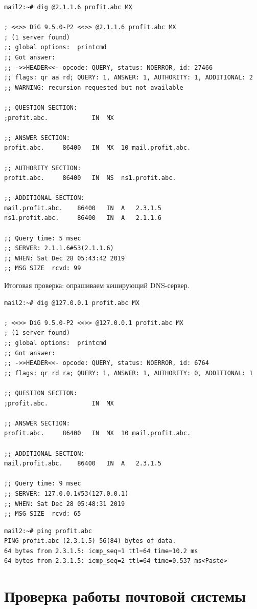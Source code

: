 \documentclass[a4paper,12pt]{article}
\begin{document}
\begin{verbatim}
mail2:~# dig @2.1.1.6 profit.abc MX

; <<>> DiG 9.5.0-P2 <<>> @2.1.1.6 profit.abc MX
; (1 server found)
;; global options:  printcmd
;; Got answer:
;; ->>HEADER<<- opcode: QUERY, status: NOERROR, id: 27466
;; flags: qr aa rd; QUERY: 1, ANSWER: 1, AUTHORITY: 1, ADDITIONAL: 2
;; WARNING: recursion requested but not available

;; QUESTION SECTION:
;profit.abc.			IN	MX

;; ANSWER SECTION:
profit.abc.		86400	IN	MX	10 mail.profit.abc.

;; AUTHORITY SECTION:
profit.abc.		86400	IN	NS	ns1.profit.abc.

;; ADDITIONAL SECTION:
mail.profit.abc.	86400	IN	A	2.3.1.5
ns1.profit.abc.		86400	IN	A	2.1.1.6

;; Query time: 5 msec
;; SERVER: 2.1.1.6#53(2.1.1.6)
;; WHEN: Sat Dec 28 05:43:42 2019
;; MSG SIZE  rcvd: 99
\end{verbatim}

Итоговая проверка: опрашиваем кеширующий DNS-сервер.

\begin{verbatim}
mail2:~# dig @127.0.0.1 profit.abc MX

; <<>> DiG 9.5.0-P2 <<>> @127.0.0.1 profit.abc MX
; (1 server found)
;; global options:  printcmd
;; Got answer:
;; ->>HEADER<<- opcode: QUERY, status: NOERROR, id: 6764
;; flags: qr rd ra; QUERY: 1, ANSWER: 1, AUTHORITY: 0, ADDITIONAL: 1

;; QUESTION SECTION:
;profit.abc.			IN	MX

;; ANSWER SECTION:
profit.abc.		86400	IN	MX	10 mail.profit.abc.

;; ADDITIONAL SECTION:
mail.profit.abc.	86400	IN	A	2.3.1.5

;; Query time: 9 msec
;; SERVER: 127.0.0.1#53(127.0.0.1)
;; WHEN: Sat Dec 28 05:48:31 2019
;; MSG SIZE  rcvd: 65
\end{verbatim}

\begin{verbatim}
mail2:~# ping profit.abc
PING profit.abc (2.3.1.5) 56(84) bytes of data.
64 bytes from 2.3.1.5: icmp_seq=1 ttl=64 time=10.2 ms
64 bytes from 2.3.1.5: icmp_seq=2 ttl=64 time=0.537 ms<Paste>
\end{verbatim}


\section{Проверка работы почтовой системы}
\end{document}

